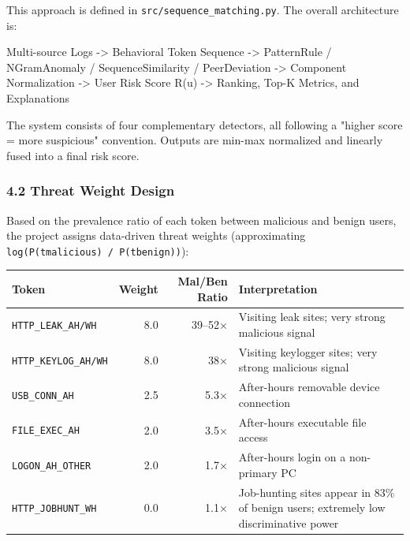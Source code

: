\documentclass[
  a4paper,
  11pt]{article}
\newenvironment{Shaded}{}{}
\newcommand{\NormalTok}[1]{#1}
\newcounter{none} %
\begin{document}
This approach is defined in \texttt{src/sequence\_matching.py}. The
overall architecture is:

\begin{Shaded}
\begin{Highlighting}[]
\NormalTok{Multi{-}source Logs}
\NormalTok{  {-}\textgreater{} Behavioral Token Sequence}
\NormalTok{  {-}\textgreater{} PatternRule / NGramAnomaly / SequenceSimilarity / PeerDeviation}
\NormalTok{  {-}\textgreater{} Component Normalization}
\NormalTok{  {-}\textgreater{} User Risk Score R(u)}
\NormalTok{  {-}\textgreater{} Ranking, Top{-}K Metrics, and Explanations}
\end{Highlighting}
\end{Shaded}

The system consists of four complementary detectors, all following a
"higher score = more suspicious" convention. Outputs are min-max
normalized and linearly fused into a final risk score.

\subsubsection{4.2 Threat Weight Design}\label{42-threat-weight-design}

Based on the prevalence ratio of each token between malicious and benign
users, the project assigns data-driven threat weights (approximating
\texttt{log(P(t\textbar{}malicious)\ /\ P(t\textbar{}benign))}):

{\def\LTcaptype{none} %
\begin{longtable}[]{@{}lrrl@{}}
\toprule\noalign{}
Token & Weight & Mal/Ben Ratio & Interpretation \\
\midrule\noalign{}
\endhead
\bottomrule\noalign{}
\endlastfoot
\texttt{HTTP\_LEAK\_AH/WH} & 8.0 & 39--52× & Visiting leak sites; very
strong malicious signal \\
\texttt{HTTP\_KEYLOG\_AH/WH} & 8.0 & 38× & Visiting keylogger sites;
very strong malicious signal \\
\texttt{USB\_CONN\_AH} & 2.5 & 5.3× & After-hours removable device
connection \\
\texttt{FILE\_EXEC\_AH} & 2.0 & 3.5× & After-hours executable file
access \\
\texttt{LOGON\_AH\_OTHER} & 2.0 & 1.7× & After-hours login on a
non-primary PC \\
\texttt{HTTP\_JOBHUNT\_WH} & 0.0 & 1.1× & Job-hunting sites appear in
83\% of benign users; extremely low discriminative power \\
\end{longtable}
}
\end{document}
